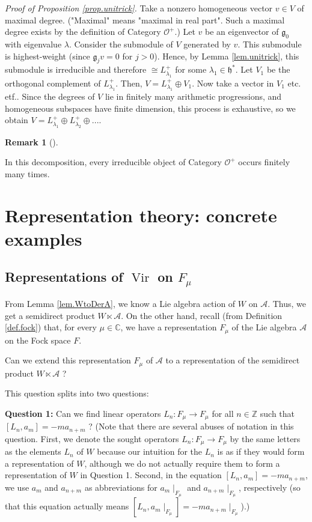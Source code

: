 \documentclass
[numbers=enddot,12pt,final,onecolumn,german,notitlepage]{scrartcl}%
\theoremstyle{definition}
\newtheorem{remk}[theo]{Remark}
\newenvironment{remark}[1][]
{\begin{remk}[#1]\begin{leftbar}}
{\end{leftbar}\end{remk}}
\begin{document}
\textit{Proof of Proposition \ref{prop.unitrick}.} Take a nonzero homogeneous
vector $v\in V$ of maximal degree. ("Maximal" means "maximal in real part".
Such a maximal degree exists by the definition of Category $\mathcal{O}^{+}$.)
Let $v$ be an eigenvector of $\mathfrak{g}_{0}$ with eigenvalue $\lambda$.
Consider the submodule of $V$ generated by $v$. This submodule is
highest-weight (since $\mathfrak{g}_{j}v=0$ for $j>0$). Hence, by Lemma
\ref{lem.unitrick}, this submodule is irreducible and therefore $\cong
L_{\lambda_{1}}^{+}$ for some $\lambda_{1}\in\mathfrak{h}^{\ast}$. Let $V_{1}$
be the orthogonal complement of $L_{\lambda_{1}}^{+}$. Then, $V=L_{\lambda
_{1}}^{+}\oplus V_{1}$. Now take a vector in $V_{1}$ etc. etf.. Since the
degrees of $V$ lie in finitely many arithmetic progressions, and homogeneous
subspaces have finite dimension, this process is exhaustive, so we obtain
$V=L_{\lambda_{1}}^{+}\oplus L_{\lambda_{2}}^{+}\oplus...$.

\begin{remark}
In this decomposition, every irreducible object of Category $\mathcal{O}^{+}$
occurs finitely many times.
\end{remark}

\section{Representation theory: concrete examples}

\subsection{\label{subsect.fockvir}Representations of $\operatorname*{Vir}$ on
$F_{\mu}$}

From Lemma \ref{lem.WtoDerA}, we know a Lie algebra action of $W$ on
$\mathcal{A}$. Thus, we get a semidirect product $W\ltimes\mathcal{A}$. On the
other hand, recall (from Definition \ref{def.fock}) that, for every $\mu
\in\mathbb{C}$, we have a representation $F_{\mu}$ of the Lie algebra
$\mathcal{A}$ on the Fock space $F$.

Can we extend this representation $F_{\mu}$ of $\mathcal{A}$ to a
representation of the semidirect product $W\ltimes\mathcal{A}$ ?

This question splits into two questions:

\textbf{Question 1:} Can we find linear operators $L_{n}:F_{\mu}\rightarrow
F_{\mu}$ for all $n\in\mathbb{Z}$ such that $\left[  L_{n},a_{m}\right]
=-ma_{n+m}$ ? (Note that there are several abuses of notation in this
question. First, we denote the sought operators $L_{n}:F_{\mu}\rightarrow
F_{\mu}$ by the same letters as the elements $L_{n}$ of $W$ because our
intuition for the $L_{n}$ is as if they would form a representation of $W$,
although we do not actually require them to form a representation of $W$ in
Question 1. Second, in the equation $\left[  L_{n},a_{m}\right]  =-ma_{n+m}$,
we use $a_{m}$ and $a_{n+m}$ as abbreviations for $a_{m}\mid_{F_{\mu}}$ and
$a_{n+m}\mid_{F_{\mu}}$, respectively (so that this equation actually means
$\left[  L_{n},a_{m}\mid_{F_{\mu}}\right]  =-ma_{n+m}\mid_{F_{\mu}}$).)
\end{document}
